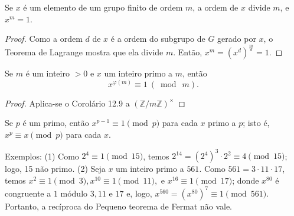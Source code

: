 \begin{corolario}
Se $x$ é um elemento de um grupo finito de ordem $m$, a ordem de $x$ divide $m$, e $x^m = 1$.    
\end{corolario}

\begin{proof}
Como a ordem $d$ de $x$ é a ordem do subgrupo de $G$ gerado por $x$, o Teorema de Lagrange mostra que ela divide $m$.
Então, $x^m = (x^d)^\frac{m}{d} = 1$.
\end{proof}

\begin{corolario}
Se $m$ é um inteiro $> 0$ e $x$ um inteiro primo a $m$, então
\[
    x^{\varphi(m)} \equiv 1 \ (\bmod \ m).
\]
\end{corolario}

\begin{proof}
Aplica-se o Corolário 12.9 a $(\mathbb{Z}/m\mathbb{Z})^\times$
\end{proof}

\begin{corolario}
Se $p$ é um primo, então $x^{p - 1} \equiv 1 \pmod p$ para cada $x$ primo a $p$; isto é, $x^p \equiv x \pmod p$
para cada $x$.
\end{corolario}

Exemplos: (1) Como $2^4 \equiv 1 \pmod {15}$, temos $2^{14} = (2^4)^3 \cdot 2^2 \equiv 4 \pmod {15}$; logo, 15 não primo.
(2) Seja $x$ um inteiro primo a $561$. Como $561 = 3 \cdot 11 \cdot 17$, temos $x^2 \equiv 1 \pmod 3, x^{10} \equiv 1 \pmod {11},
\text{ e } x^{16} \equiv 1 \pmod {17}$; donde $x^{80}$ é congruente a $1$ módulo $3,11 \text{ e } 17$ e, logo, 
$x^{560} = (x^{80})^7 \equiv 1 \pmod {561}$. Portanto, a recíproca do Pequeno teorema de Fermat não vale. 

